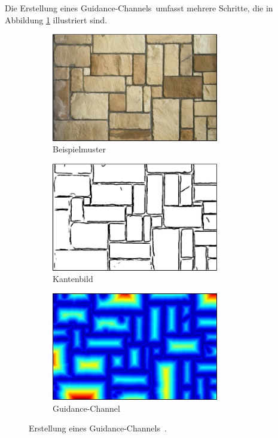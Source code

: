Die Erstellung eines \glqq Guidance-Channels\grqq \ umfasst mehrere Schritte, die in Abbildung \ref{guidance-channel} illustriert sind.

\begin{figure}
	\centering
	\begin{subfigure}{0.3\textwidth}
		\centering
		\includegraphics[width=0.8\textwidth]{images/guidance-channel-1}
		\caption{Beispielmuster}
	\end{subfigure}
	\hfill
	\begin{subfigure}{0.3\textwidth}
		\centering
		\includegraphics[width=0.8\textwidth]{images/guidance-channel-2}
		\caption{Kantenbild}
	\end{subfigure}
	\hfill
	\begin{subfigure}{0.3\textwidth}
		\centering
		\includegraphics[width=0.8\textwidth]{images/guidance-channel-3}
		\caption{\glqq Guidance-Channel\grqq}
	\end{subfigure}
	
	\caption{Erstellung eines \glqq Guidance-Channels\grqq \ \cite{SelfTuning}.}
	\label{guidance-channel}
\end{figure}

